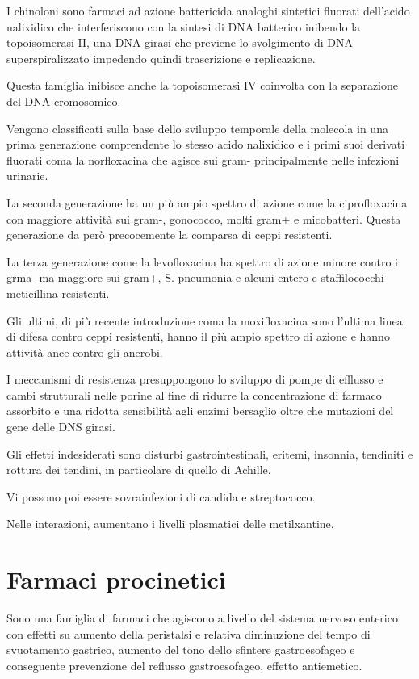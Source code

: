 I chinoloni sono farmaci ad azione battericida analoghi sintetici fluorati dell'acido nalixidico che interferiscono con la sintesi di DNA batterico inibendo la topoisomerasi II, una DNA girasi che previene lo svolgimento di DNA superspiralizzato impedendo quindi trascrizione e replicazione.

Questa famiglia inibisce anche la topoisomerasi IV coinvolta con la separazione del DNA cromosomico.

Vengono classificati sulla base dello sviluppo temporale della molecola in una prima generazione comprendente lo stesso acido nalixidico e i primi suoi derivati fluorati coma la norfloxacina che agisce sui gram- principalmente nelle infezioni urinarie.

La seconda generazione ha un più ampio spettro di azione come la ciprofloxacina con maggiore attività sui gram-, gonococco, molti gram+ e micobatteri. Questa generazione da però precocemente la comparsa di ceppi resistenti.

La terza generazione come la levofloxacina ha spettro di azione minore contro i grma- ma maggiore sui gram+, S. pneumonia e alcuni entero e staffilococchi meticillina resistenti.

Gli ultimi, di più recente introduzione coma la moxifloxacina sono l'ultima linea di difesa contro ceppi resistenti, hanno il più ampio spettro di azione e hanno attività ance contro gli anerobi.

I meccanismi di resistenza presuppongono lo sviluppo di pompe di efflusso e cambi strutturali nelle porine al fine di ridurre la concentrazione di farmaco assorbito e una ridotta sensibilità agli enzimi bersaglio oltre che mutazioni del gene delle DNS girasi.

Gli effetti indesiderati sono disturbi gastrointestinali, eritemi, insonnia, tendiniti e rottura dei tendini, in particolare di quello di Achille. 

Vi possono poi essere sovrainfezioni di candida e streptococco.

Nelle interazioni, aumentano i livelli plasmatici delle metilxantine.

\section{Farmaci procinetici}

Sono una famiglia di farmaci che agiscono a livello del sistema nervoso enterico con effetti su aumento della peristalsi e relativa diminuzione del tempo di svuotamento gastrico, aumento del tono dello sfintere gastroesofageo e conseguente prevenzione del reflusso gastroesofageo, effetto antiemetico.

